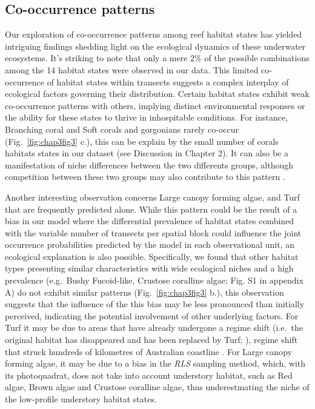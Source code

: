 \begin{refsection}
\hypertarget{co-occurrence-patterns}{%
\subsection{Co-occurrence patterns}\label{co-occurrence-patterns}}

Our exploration of co-occurrence patterns among reef habitat states has
yielded intriguing findings shedding light on the ecological dynamics of
these underwater ecosystems. It's striking to note that only a mere 2\%
of the possible combinations among the 14 habitat states were observed
in our data. This limited co-occurrence of habitat states within
transects suggests a complex interplay of ecological factors governing
their distribution. Certain habitat states exhibit weak co-occurrence
patterns with others, implying distinct environmental responses or the
ability for these states to thrive in inhospitable conditions. For
instance, Branching coral and Soft corals and gorgonians rarely co-occur
(Fig.~\ref{fig:chap3fig3} c.), this can be explain by the small number
of corals habitats states in our dataset (see Discussion in Chapter 2).
It can also be a manifestation of niche differences between the two
differents groups, although competition between these two groups may
also contribute to this pattern \autocite{Sammarco_1983}.

Another interesting observation concerns Large canopy forming algae, and
Turf that are frequently predicted alone. While this pattern could be
the result of a bias in our model where the differential prevalence of
habitat states combined with the variable number of transects per
spatial block could influence the joint occurrence probabilities
predicted by the model in each observational unit, an ecological
explanation is also possible. Specifically, we found that other habitat
types presenting similar characteristics with wide ecological niches and
a high prevalence (e.g.~Bushy Fucoid-like, Crustose coralline algae;
Fig. S1 in appendix A) do not exhibit similar patterns
(Fig.~\ref{fig:chap3fig3} b.), this observation suggests that the
influence of the this bias may be less pronounced than initially
perceived, indicating the potential involvement of other underlying
factors. For Turf it may be due to areas that have already undergone a
regime shift (i.e.~the original habitat has disappeared and has been
replaced by Turf; \textcite{Jouffray_2015}), regime shift that struck
hundreds of kilometres of Australian coastline
\autocite{Filbee-Dexter_2018}. For Large canopy forming algae, it may be
due to a bias in the \emph{RLS} sampling method, which, with its
photoquadrat, does not take into account understory habitat, such as Red
algae, Brown algae and Crustose coralline algae, thus underestmating the
niche of the low-profile understory habitat states.


\end{refsection}
